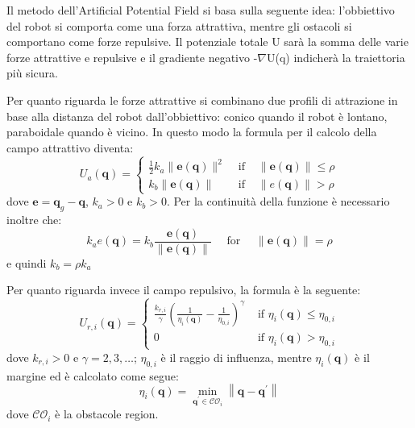 \documentclass[Lau, binding=0.6cm, oneside]{sapthesis}
\begin{document}
Il metodo dell'Artificial Potential Field si basa sulla seguente idea: l'obbiettivo del robot si comporta come una forza attrattiva, mentre gli ostacoli si comportano come forze repulsive.
Il potenziale totale U sarà la somma delle varie forze attrattive e repulsive e il gradiente negativo -$\nabla$U(q) indicherà la traiettoria più sicura.\cite{fonte1}

Per quanto riguarda le forze attrattive si combinano due profili di attrazione in base alla distanza del robot dall'obbiettivo: conico quando il robot è lontano, paraboidale quando è vicino.
In questo modo la formula per il calcolo della campo attrattivo diventa:
\newline
$$
U_{a}(\boldsymbol{q})=\left\{\begin{array}{cll}
\frac{1}{2} k_{a}\|\boldsymbol{e}(\boldsymbol{q})\|^{2} & \text { if } & \|\boldsymbol{e}(\boldsymbol{q})\| \leq \rho \\
k_{b}\|\boldsymbol{e}(\boldsymbol{q})\| & \text { if } & \|e(\boldsymbol{q})\|>\rho
\end{array}\right.
$$
\newline
dove $\boldsymbol{e}=\boldsymbol{q}_{g}-\boldsymbol{q}$, $k_{a}>0$ e $k_{b}>0$.
Per la continuità della funzione è necessario inoltre che:
$$
k_{a} e(\boldsymbol{q})=k_{b} \frac{\boldsymbol{e}(\boldsymbol{q})}{\|\boldsymbol{e}(\boldsymbol{q})\|} \quad \text { for } \quad\|\boldsymbol{e}(\boldsymbol{q})\|=\rho
$$
\newline
e quindi $k_{b}=\rho k_{a}$
\cite{fonte1}

Per quanto riguarda invece il campo repulsivo, la formula è la seguente:
\newline
$$
U_{r, i}(\boldsymbol{q})=\left\{\begin{array}{ll}
\frac{k_{r, i}}{\gamma}\left(\frac{1}{\eta_{i}(\boldsymbol{q})}-\frac{1}{\eta_{0, i}}\right)^{\gamma} & \text { if } \eta_{i}(\boldsymbol{q}) \leq \eta_{0, i} \\
0 & \text { if } \eta_{i}(\boldsymbol{q})>\eta_{0, i}
\end{array}\right.
$$
\newline
dove $k_{r, i}>0$ e $\gamma=2,3, \ldots$; $\eta_{0, i}$ è il raggio di influenza, mentre $\eta_{i}(\boldsymbol{q})$ è il margine ed è calcolato come segue:
$$
\eta_{i}(\boldsymbol{q})=\min _{\boldsymbol{q}^{\prime} \in \mathcal{C O}_{i}}\left\|\boldsymbol{q}-\boldsymbol{q}^{\prime}\right\|
$$
\newline
dove $\mathcal{C O}_{i}$ è la obstacole region.\cite{fonte1}
\end{document}
